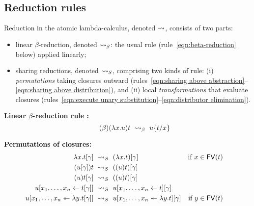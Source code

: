 \documentclass{llncs} %
\begin{document}
\subsection{Reduction rules}


Reduction in the atomic lambda-calculus, denoted $\rewrite$, consists of two parts:
\begin{itemize}
 \item linear $\beta$-reduction, denoted $\ALbeta$: the usual rule (rule~\ref{eqn:beta-reduction} below) applied linearly;
 \item sharing reductions, denoted $\ALnotbeta$, comprising two kinds of rule: (i) \emph{permutations} taking closures outward (rules~\ref{eqn:sharing above abstraction}--\ref{eqn:sharing above distribution}), and (ii) local \emph{transformations} that evaluate closures (rules~\ref{eqn:execute unary substitution}--\ref{eqn:distributor elimination}).
\end{itemize}


\noindent
{\bf Linear  $\beta$-reduction rule :}
%
\begin{equation}\tag{$\beta$}\label{eqn:beta-reduction}
	(\lambda x.u)t ~\ALbeta~ u\sub xt
\end{equation}


\noindent
{\bf Permutations of closures:}
%
\begin{align}\label{eqn:sharing above abstraction}
	\lambda x.t\g & ~\ALnotbeta~ (\lambda x.t)\g
		 & \text{if}~x\in\FV(t) &&&
\\\label{eqn:sharing above application function}
	(u\g)t & ~\ALnotbeta~ ((u)t)\g
\\\label{eqn:sharing above application argument}
	(u)t\g & ~\ALnotbeta~ ((u)t)\g
\\\label{eqn:sharing above sharing}
	u\share x{t\g} & ~\ALnotbeta~ u\share xt\g
\\\label{eqn:sharing above distribution}
	u\distr xy{t\g} & ~\ALnotbeta~ u\distr xyt\g
		& \text{if}~y\in\FV(t) &&&
\end{align}
\end{document}
